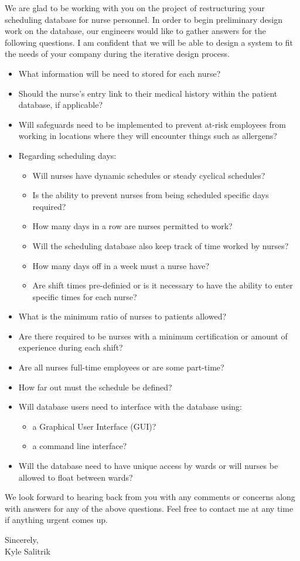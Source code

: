 \documentclass[a4paper,12pt]{texMemo}
\begin{document}
\maketitle
We are glad to be working with you on the project of restructuring your scheduling database for nurse personnel. In order to begin preliminary design work on the database, our engineers would like to gather answers for the following questions. I am confident that we will be able to design a system to fit the needs of your company during the iterative design process.
	\begin{itemize}
	\setlength\itemsep{0em}
			\item What information will be need to stored for each nurse?
			\item Should the nurse's entry link to their medical history within the patient database, if applicable?
			\item Will safeguards need to be implemented to prevent at-risk employees from working in locations where they will encounter things such as allergens?
			\item Regarding scheduling days:
			\begin{itemize}
			\setlength\itemsep{0em}
				\item Will nurses have dynamic schedules or steady cyclical schedules?
				\item Is the ability to prevent nurses from being scheduled specific days required?
				\item How many days in a row are nurses permitted to work?
				\item Will the scheduling database also keep track of time worked by nurses?
				\item How many days off in a week must a nurse have?
				\item Are shift times pre-definied or is it necessary to have the ability to enter specific times for each nurse?
			\end{itemize}
			\item What is the minimum ratio of nurses to patients allowed?
			\item Are there required to be nurses with a minimum certification or amount of experience during each shift?
			\item Are all nurses full-time employees or are some part-time?
			\item How far out must the schedule be defined?
			\item Will database users need to interface with the database using:
			\begin{itemize}
			\setlength\itemsep{0em}
				\item a Graphical User Interface (GUI)?
				\item a command line interface?
			\end{itemize}
			\item Will the database need to have unique access by wards or will nurses be allowed to float between wards?
	\end{itemize}

We look forward to hearing back from you with any comments or concerns along with answers for any of the above questions. Feel free to contact me at any time if anything urgent comes up.
\bigskip{}\decorativeline\bigskip{}

Sincerely,\\

\quad Kyle Salitrik
\end{document}
